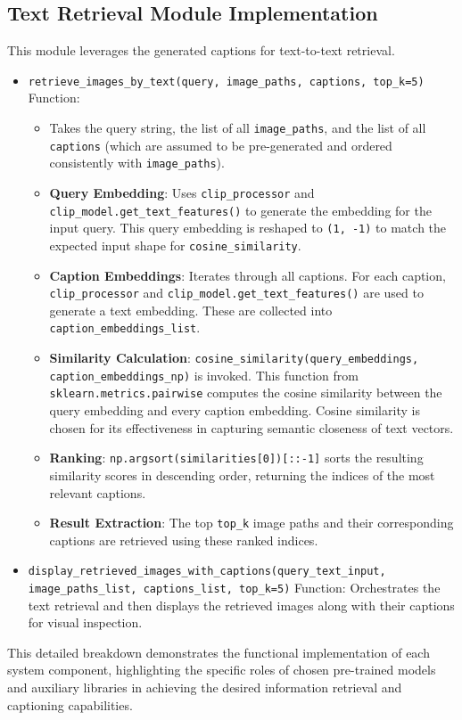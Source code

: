 \documentclass{article}
\begin{document}
\subsection{Text Retrieval Module Implementation}
This module leverages the generated captions for text-to-text retrieval.
\begin{itemize}
    \item \texttt{retrieve\_images\_by\_text(query, image\_paths, captions, top\_k=5)} Function:
    \begin{itemize}
        \item Takes the query string, the list of all \texttt{image\_paths}, and the list of all \texttt{captions} (which are assumed to be pre-generated and ordered consistently with \texttt{image\_paths}).
        \item \textbf{Query Embedding}: Uses \texttt{clip\_processor} and \texttt{clip\_model.get\_text\_features()} to generate the embedding for the input query. This query embedding is reshaped to \texttt{(1, -1)} to match the expected input shape for \texttt{cosine\_similarity}.
        \item \textbf{Caption Embeddings}: Iterates through all captions. For each caption, \texttt{clip\_processor} and \texttt{clip\_model.get\_text\_features()} are used to generate a text embedding. These are collected into \texttt{caption\_embeddings\_list}.
        \item \textbf{Similarity Calculation}: \texttt{cosine\_similarity(query\_embeddings, caption\_embeddings\_np)} is invoked. This function from \texttt{sklearn.metrics.pairwise} computes the cosine similarity between the query embedding and every caption embedding. Cosine similarity is chosen for its effectiveness in capturing semantic closeness of text vectors.
        \item \textbf{Ranking}: \texttt{np.argsort(similarities[0])[::-1]} sorts the resulting similarity scores in descending order, returning the indices of the most relevant captions.
        \item \textbf{Result Extraction}: The top \texttt{top\_k} image paths and their corresponding captions are retrieved using these ranked indices.
    \end{itemize}
    \item \texttt{display\_retrieved\_images\_with\_captions(query\_text\_input, image\_paths\_list, captions\_list, top\_k=5)} Function: Orchestrates the text retrieval and then displays the retrieved images along with their captions for visual inspection.
\end{itemize}
This detailed breakdown demonstrates the functional implementation of each system component, highlighting the specific roles of chosen pre-trained models and auxiliary libraries in achieving the desired information retrieval and captioning capabilities.
\end{document}
